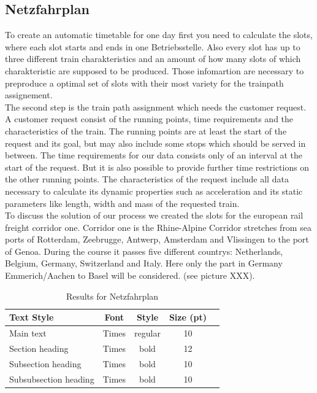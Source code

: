 \subsection{Netzfahrplan}
\label{chap:Netzfahrplan}
To create an automatic timetable for one day first you need to calculate the slots, where each slot starts and ends in one Betriebsstelle. Also every slot has up to three different train charakteristics and an amount of how many slots of which charakteristic are supposed to be produced. Those infomartion are necessary to preproduce a optimal set of slots with their most variety for the trainpath assignement.  \\
The second step is the train path assignment which needs the customer request. A customer request consist of the running points, time requirements and the characteristics of the train. The running points are at least the start of the request and its goal, but may also include some stops which should be served in between. The time requirements for our data consists only of an interval at the start of the request. But it is also possible to provide further time restrictions on the other running points. The characteristics of the request include all data necessary to calculate its dynamic properties such as acceleration and its static parameters like length, width and mass of the requested train.  \\
To discuss the solution of our process we created the slots for the european rail freight corridor one. Corridor one is the Rhine-Alpine Corridor stretches from sea ports of Rotterdam, Zeebrugge, Antwerp, Amsterdam and Vlissingen to the port of Genoa. During the course it passes five different countrys: Netherlands, Belgium, Germany, Switzerland and Italy. Here only the part in Germany Emmerich/Aachen to Basel will be considered. (see picture XXX). \\


%
\begin{table}[h]
	\centering
	\caption{Results for Netzfahrplan}
	\label{tab:result_Netzfpl}
	\begin{tabular}{lcccc} \hline
		\textbf{Text Style}   & \textbf{Font} & \textbf{Style} & \textbf{Size (pt)} \\ \hline
		Main text             & Times         & regular        & 10                 \\
		Section heading       & Times         & bold           & 12                 \\
		Subsection heading    & Times         & bold           & 10                 \\
		Subsubsection heading & Times         & bold           & 10                 \\ \hline
	\end{tabular}
\end{table}
\par


